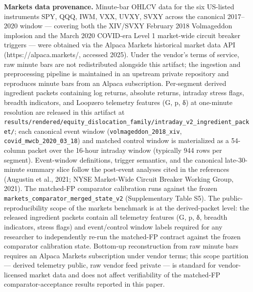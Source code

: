 \documentclass[
  11pt,
]{article}
\begin{document}
\textbf{Markets data provenance.} Minute-bar OHLCV data for the six
US-listed instruments SPY, QQQ, IWM, VXX, UVXY, SVXY across the
canonical 2017--2020 window --- covering both the XIV/SVXY February 2018
Volmageddon implosion and the March 2020 COVID-era Level 1 market-wide
circuit breaker triggers --- were obtained via the Alpaca Markets
historical market data API (https://alpaca.markets/, accessed 2025).
Under the vendor's terms of service, raw minute bars are not
redistributed alongside this artifact; the ingestion and preprocessing
pipeline is maintained in an upstream private repository and reproduces
minute bars from an Alpaca subscription. Per-segment derived ingredient
packets containing log returns, absolute returns, intraday stress flags,
breadth indicators, and Loopzero telemetry features (G, p, δ) at
one-minute resolution are released in this artifact at
\texttt{results/rendered/equity\_dislocation\_family/intraday\_v2\_ingredient\_packet/};
each canonical event window (\texttt{volmageddon\_2018\_xiv},
\texttt{covid\_mwcb\_2020\_03\_18}) and matched control window is
materialized as a 54-column packet over the 16-hour intraday window
(typically 944 rows per segment). Event-window definitions, trigger
semantics, and the canonical late-30-minute summary slice follow the
post-event analyses cited in the references (Augustin et al., 2021; NYSE
Market-Wide Circuit Breaker Working Group, 2021). The matched-FP
comparator calibration runs against the frozen
\texttt{markets\_comparator\_merged\_state\_v2} (Supplementary Table
S5). The public-reproducibility scope of the markets benchmark is at the
derived-packet level: the released ingredient packets contain all
telemetry features (G, p, δ, breadth indicators, stress flags) and
event/control window labels required for any researcher to independently
re-run the matched-FP contract against the frozen comparator calibration
state. Bottom-up reconstruction from raw minute bars requires an Alpaca
Markets subscription under vendor terms; this scope partition ---
derived telemetry public, raw vendor feed private --- is standard for
vendor-licensed market data and does not affect verifiability of the
matched-FP comparator-acceptance results reported in this paper.
\end{document}
